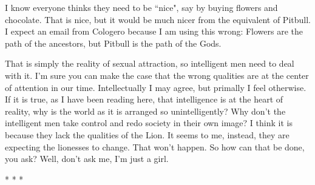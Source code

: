 I know everyone thinks they need to be ``nice", say by buying flowers and chocolate. That is nice, but it would be much nicer from the equivalent of Pitbull. I expect an email from Cologero because I am using this wrong: Flowers are the path of the ancestors, but Pitbull is the path of the Gods.

That is simply the reality of sexual attraction, so intelligent men need to deal with it. I'm sure you can make the case that the wrong qualities are at the center of attention in our time. Intellectually I may agree, but primally I feel otherwise. If it is true, as I have been reading here, that intelligence is at the heart of reality, why is the world as it is arranged so unintelligently? Why don't the intelligent men take control and redo society in their own image? I think it is because they lack the qualities of the Lion. It seems to me, instead, they are expecting the lionesses to change. That won't happen. So how can that be done, you ask? Well, don't ask me, I'm just a girl.




\begin{center}* * *\end{center}

